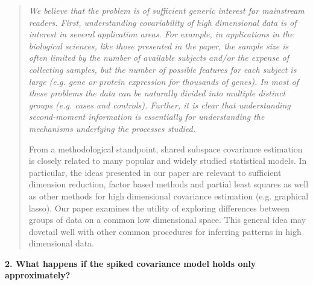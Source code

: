 \documentclass{article}
\newenvironment{resp}{\begin{quotation}\noindent\slshape}{\end{quotation}}
\begin{document}
\begin{resp}
We believe that the problem is of sufficient generic interest for mainstream readers. First, understanding covariability of high dimensional data is of interest in several application areas. For example, in applications in the biological sciences, like those presented in the paper, the sample size is often limited by the number of available subjects and/or the expense of collecting samples, but the number of possible features for each subject is large (e.g. gene or protein expression for thousands of genes).  In most of these problems the data can be naturally divided into multiple distinct groups (e.g. cases and controls).  Further, it is clear that understanding second-moment information is essentially for understanding the mechanisms underlying the processes studied.  

From a methodological standpoint, shared subspace covariance estimation is closely related to many popular and widely studied statistical models.  In particular, the ideas presented in our paper are relevant to sufficient dimension reduction, factor based methods and partial least squares as well as other methods for high dimensional covariance estimation (e.g. graphical lasso). Our paper examines the utility of exploring differences between groups of data on a common low dimensional space.  This general idea may dovetail well with other common procedures for inferring patterns in high dimensional data.

\end{resp}

\textbf{2. What happens if the spiked covariance model holds only approximately?}
\end{document}
